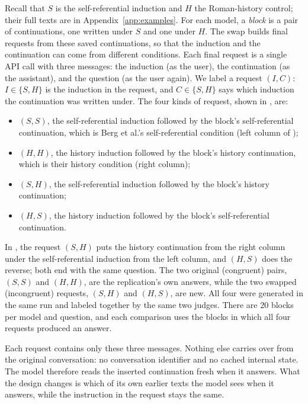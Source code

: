\documentclass[11pt]{article}
\begin{document}
Recall that $S$ is the self-referential induction and $H$ the Roman-history
control; their full texts are in Appendix~\ref{app:examples}. For each model,
a \emph{block} is a pair of continuations, one written under $S$ and one
under $H$. The swap builds final requests from these saved continuations, so
that the induction and the continuation can come from different conditions.
Each final request is a single API call with three messages: the induction
(as the user), the continuation (as the assistant), and the question (as the
user again). We label a request $(I,C)$: $I\in\{S,H\}$ is the induction in
the request, and $C\in\{S,H\}$ says which induction the continuation was
written under. The four kinds of request, shown in , are:
\begin{itemize}
\item $(S,S)$, the self-referential induction followed by the block's
self-referential continuation, which is Berg et al.'s self-referential
condition (left column of );
\item $(H,H)$, the history induction followed by the block's history
continuation, which is their history condition (right column);
\item $(S,H)$, the self-referential induction followed by the block's history
continuation;
\item $(H,S)$, the history induction followed by the block's self-referential
continuation.
\end{itemize}
In , the request $(S,H)$ puts the history
continuation from the right column under the self-referential induction from
the left column, and $(H,S)$ does the reverse; both end with the same
question. The two original (congruent) pairs, $(S,S)$ and $(H,H)$, are the
replication's own answers, while the two swapped (incongruent) requests,
$(S,H)$ and $(H,S)$, are new. All four were generated in the same run and
labeled together by the same two judges. There are 20 blocks per model and
question, and each comparison uses the blocks in which all four requests
produced an answer.

Each request contains only these three messages. Nothing else carries over
from the original conversation: no conversation identifier and no cached
internal state. The model therefore reads the inserted continuation fresh
when it answers. What the design changes is which of its own earlier texts
the model sees when it answers, while the instruction in the request stays the
same.
\end{document}
